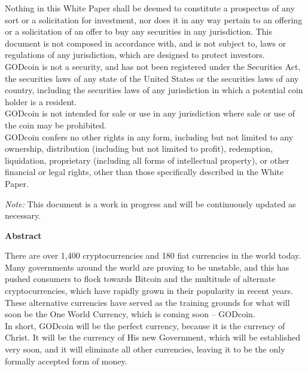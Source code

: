 \documentclass[12pt,a4paper]{article}
\begin{document}
  Nothing in this White Paper shall be deemed to constitute a prospectus of any
  sort or a solicitation for investment, nor does it in any way pertain to an
  offering or a solicitation of an offer to buy any securities in any
  jurisdiction. This document is not composed in accordance with, and is not
  subject to, laws or regulations of any jurisdiction, which are designed to
  protect investors.\\

  GODcoin is not a security, and has not been registered under the Securities
  Act, the securities laws of any state of the United States or the securities
  laws of any country, including the securities laws of any jurisdiction in
  which a potential coin holder is a resident.\\

  GODcoin is not intended for sale or use in any jurisdiction where sale or use
  of the coin may be prohibited.\\

  GODcoin confers no other rights in any form, including but not limited to any
  ownership, distribution (including but not limited to profit), redemption,
  liquidation, proprietary (including all forms of intellectual property), or
  other financial or legal rights, other than those specifically described in
  the White Paper.

  \medskip
  \textit{Note:} This document is a work in progress and will be continuously
  updated as necessary.

  \newpage
  \begin{center}
    \Large{\textbf{Abstract}}
  \end{center}
  \setlength{\parindent}{0pt}
  \vspace{3mm}
  \vspace{3mm}

  There are over 1,400 cryptocurrencies and 180 fiat currencies in
  the world today. Many governments around the world are proving to be
  unstable, and this has pushed consumers to flock towards Bitcoin and the
  multitude of alternate cryptocurrencies, which have rapidly grown in their
  popularity in recent years. These alternative currencies have served as the
  training grounds for what will soon be the One World Currency, which is
  coming soon – GODcoin.\\

  In short, GODcoin will be the perfect currency, because it is the currency
  of Christ. It will be the currency of His new Government, which will be
  established very soon, and it will eliminate all other currencies, leaving
  it to be the only formally accepted form of money.\\
\end{document}

